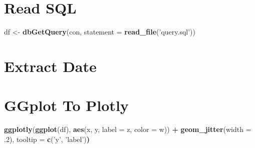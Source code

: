 \documentclass[]{book}
\newenvironment{Shaded}{\begin{snugshade}}{\end{snugshade}}
\newcommand{\DataTypeTok}[1]{\textcolor[rgb]{0.13,0.29,0.53}{#1}}
\newcommand{\ErrorTok}[1]{\textcolor[rgb]{0.64,0.00,0.00}{\textbf{#1}}}
\newcommand{\FloatTok}[1]{\textcolor[rgb]{0.00,0.00,0.81}{#1}}
\newcommand{\KeywordTok}[1]{\textcolor[rgb]{0.13,0.29,0.53}{\textbf{#1}}}
\newcommand{\NormalTok}[1]{#1}
\newcommand{\OperatorTok}[1]{\textcolor[rgb]{0.81,0.36,0.00}{\textbf{#1}}}
\newcommand{\StringTok}[1]{\textcolor[rgb]{0.31,0.60,0.02}{#1}}
\begin{document}
\hypertarget{read-sql}{%
\section{Read SQL}\label{read-sql}}

\begin{Shaded}
\begin{Highlighting}[]
\NormalTok{df <-}\StringTok{ }\KeywordTok{dbGetQuery}\NormalTok{(con, }\DataTypeTok{statement =} \KeywordTok{read_file}\NormalTok{(}\StringTok{'query.sql'}\NormalTok{))}
\end{Highlighting}
\end{Shaded}

\hypertarget{extract-date}{%
\section{Extract Date}\label{extract-date}}

\begin{Shaded}
\end{Shaded}

\hypertarget{ggplot-to-plotly}{%
\section{GGplot To Plotly}\label{ggplot-to-plotly}}

\begin{Shaded}
\begin{Highlighting}[]
\KeywordTok{ggplotly}\NormalTok{(}\KeywordTok{ggplot}\NormalTok{(df), }\KeywordTok{aes}\NormalTok{(x, y, }\DataTypeTok{label =}\NormalTok{ z, }\DataTypeTok{color =}\NormalTok{ w)) }\OperatorTok{+}
\StringTok{        }\KeywordTok{geom_jitter}\NormalTok{(}\DataTypeTok{width =} \FloatTok{.2}\NormalTok{), tooltip =}\StringTok{ }\KeywordTok{c}\NormalTok{(}\StringTok{'y'}\NormalTok{, }\StringTok{'label'}\NormalTok{)}\ErrorTok{)}
\end{Highlighting}
\end{Shaded}
\end{document}

